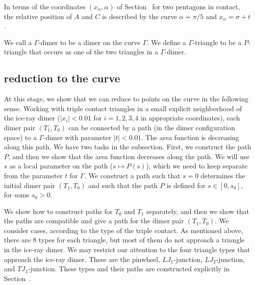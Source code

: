 In terms of the coordinates $(x_\alpha,\alpha)$ of
Section~ for two pentagons in contact, the relative
position of $A$ and $C$ is described by the curve $\alpha=\pi/5$ and
$x_\alpha = \sigma+t$.

We call a $\Gamma$-dimer to be a dimer on the curve $\Gamma$.  We
define a $\Gamma$-triangle to be a $P$-triangle that occurs as one of
the two triangles in a $\Gamma$-dimer.


\subsection{reduction to the curve}

At this stage, we show that we can reduce to points on the curve in
the following sense.  Working with triple contact triangles in a small
explicit neighborhood of the ice-ray dimer ($|x_i|<0.01$ for
$i=1,2,3,4$ in appropriate coordinates), each dimer pair $(T_1,T_0)$
can be connected by a path (in the dimer configuration space) to a
$\Gamma$-dimer with parameter $|t|<0.01$.  The area function is
decreasing along this path.  We have two tasks in the subsection.
First, we construct the path $P$, and then we show that the area
function decreases along the path.  We will use $s$ as a local
parameter on the path ($s\mapsto P(s)$), which we need to keep
separate from the parameter $t$ for $\Gamma$.  We construct a path
such that $s=0$ determines the initial dimer pair $(T_1,T_0)$ and such
that the path $P$ is defined for $s\in [0,s_0]$, for some $s_0>0$.

We show how to construct paths for $T_0$ and $T_1$ separately, and
then we show that the paths are compatible and give a path for the
dimer pair $(T_1,T_0)$.  We consider cases, according to the type of
the triple contact.  As mentioned above, there are $8$ types for each
triangle, but most of them do not approach a triangle in the ice-ray
dimer.  We may restrict our attention to the four triangle types that
approach the ice-ray dimer.  These are the pinwheel, $LJ_1$-junction,
$LJ_2$-junction, and $TJ_3$-junction.  These types and their paths are
constructed explicitly in Section~.

